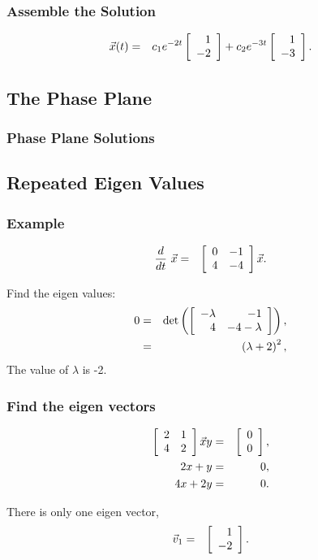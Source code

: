 \begin{frame}
  \frametitle{Assemble the Solution}

  \begin{eqnarray*}
    \vec{x}(t) & = & c_1 e^{-2t} \vecTwo{1}{-2} + c_2 e^{-3t} \vecTwo{1}{-3}.
  \end{eqnarray*}

\end{frame}


\subsection{The Phase Plane}

\begin{frame}
  \frametitle{Phase Plane Solutions}


\end{frame}

\subsection{Repeated Eigen Values}

\begin{frame}
  \frametitle{Example}

  \begin{eqnarray*}
    \deriv{~}{t} \vec{x} & = & \arrayTwo{0}{-1}{4}{-4} \vec{x}.
  \end{eqnarray*}

  {
    Find the eigen values:
    \begin{eqnarray*}
      0 & = & \det\lp\arrayTwo{-\lambda}{-1}{4}{-4-\lambda}\rp, \\
      & = & \lp \lambda + 2 \rp^2,
    \end{eqnarray*}
    The value of $\lambda$ is -2.
  }

\end{frame}


\begin{frame}
  \frametitle{Find the eigen vectors}

  \begin{eqnarray*}
    \arrayTwo{2}{1}{4}{2} \vec{x}{y} & = & \vecTwo{0}{0}, \\
    2x + y & = & 0, \\
    4x + 2y & = & 0.
  \end{eqnarray*}

  There is only one eigen vector,
  \begin{eqnarray*}
    \vec{v}_1 & = & \vecTwo{1}{-2}.
  \end{eqnarray*}

\end{frame}

